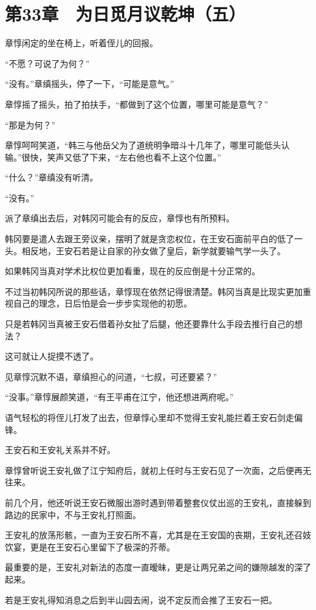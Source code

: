 \section{第33章　为日觅月议乾坤（五）}

章惇闲定的坐在椅上，听着侄儿的回报。

“不愿？可说了为何？”

“没有。”章缜摇头，停了一下，“可能是意气。”

章惇摇了摇头，拍了拍扶手，“都做到了这个位置，哪里可能是意气？”

“那是为何？”

章惇呵呵笑道，“韩三与他岳父为了道统明争暗斗十几年了，哪里可能低头认输。”很快，笑声又低了下来，“左右他也看不上这个位置。”

“什么？”章缜没有听清。

“没有。”

派了章缜出去后，对韩冈可能会有的反应，章惇也有所预料。

韩冈要是遣人去跟王旁议亲，摆明了就是贪恋权位，在王安石面前平白的低了一头。相反地，王安石若是让自家的孙女做了皇后，新学就要输气学一头了。

如果韩冈当真对学术比权位更加看重，现在的反应倒是十分正常的。

不过当初韩冈所说的那些话，章惇现在依然记得很清楚。韩冈当真是比现实更加重视自己的理念，日后怕是会一步步实现他的初愿。

只是若韩冈当真被王安石借着孙女扯了后腿，他还要靠什么手段去推行自己的想法？

这可就让人捉摸不透了。

见章惇沉默不语，章缜担心的问道，“七叔，可还要紧？”

“没事。”章惇展颜笑道，“有王平甫在江宁，他还想进两府呢。”

语气轻松的将侄儿打发了出去，但章惇心里却不觉得王安礼能拦着王安石剑走偏锋。

王安石和王安礼关系并不好。

章惇曾听说王安礼做了江宁知府后，就初上任时与王安石见了一次面，之后便再无往来。

前几个月，他还听说王安石微服出游时遇到带着整套仪仗出巡的王安礼，直接躲到路边的民家中，不与王安礼打照面。

王安礼的放荡形骸，一直为王安石所不喜，尤其是在王安国的丧期，王安礼还召妓饮宴，更是在王安石心里留下了极深的芥蒂。

最重要的是，王安礼对新法的态度一直暧昧，更是让两兄弟之间的嫌隙越发的深了起来。

若是王安礼得知消息之后到半山园去闹，说不定反而会推了王安石一把。

